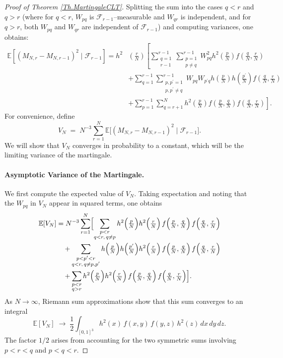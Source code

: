 \documentclass[11pt, reqno]{amsart}
\numberwithin{equation}{section}
\begin{document}
\begin{proof}[Proof of Theorem \ref{Th.MartingaleCLT}]
   
Splitting the sum into the cases $q<r$ and $q>r$ (where for $q<r$, $W_{pq}$ is $\mathcal F_{r-1}$–measurable and $W_{qr}$ is independent, and for $q>r$, both $W_{pq}$ and $W_{qr}$ are independent of $\mathcal F_{r-1}$) and computing variances, one obtains:
$$
\begin{aligned}
\mathbb{E}\left[\left(M_{N, r}-M_{N, r-1}\right)^2 \mid \mathcal{F}_{r-1}\right]=h^2 & \left(\frac{r}{N}\right)\left[\sum_{\substack{q=1 \\
r-1}}^{r-1} \sum_{\substack{p=1 \\
p \neq q}}^{r-1} W_{p q}^2 h^2\left(\frac{p}{N}\right) f\left(\frac{q}{N}, \frac{r}{N}\right)\right. \\
& +\sum_{q=1}^{r-1} \sum_{\substack{p, p^{\prime}=1 \\
p, p^{\prime} \neq q}}^{r-1} W_{p q} W_{p^{\prime} q} h\left(\frac{p}{N}\right) h\left(\frac{p^{\prime}}{N}\right) f\left(\frac{q}{N}, \frac{r}{N}\right) \\
& \left.+\sum_{p=1}^{r-1} \sum_{q=r+1}^N h^2\left(\frac{p}{N}\right) f\left(\frac{p}{N}, \frac{q}{N}\right) f\left(\frac{q}{N}, \frac{r}{N}\right)\right] .
\end{aligned}
$$
For convenience, define
\[
V_N \;=\; N^{-3}\sum_{r=1}^N \mathbb{E}\bigl[(M_{N,r} - M_{N,r-1})^2 \mid \mathcal{F}_{r-1}\bigr].
\]
We will show that $V_N$ converges in probability to a constant, which will be the limiting variance of the martingale.

\paragraph{\bf Asymptotic Variance of the Martingale.}
We first compute the expected value of $V_N$.  Taking expectation and noting that the $W_{pq}$ in $V_N$ appear in squared terms, one obtains
\[
\begin{aligned}
\mathbb{E}[V_N] &= N^{-3} \sum_{r=1}^N \Bigl[
   \sum_{\substack{p<r\\ q<r,\,q\neq p}} h^2\Bigl(\tfrac{p}{N}\Bigr)h^2\Bigl(\tfrac{r}{N}\Bigr)\,f\Bigl(\tfrac{p}{N},\tfrac{q}{N}\Bigr)\,f\Bigl(\tfrac{q}{N},\tfrac{r}{N}\Bigr) \\
&\quad + \sum_{\substack{p<p'<r\\ q<r,\,q\neq p,p'}} h\Bigl(\tfrac{p}{N}\Bigr)h\Bigl(\tfrac{p'}{N}\Bigr)h^2\Bigl(\tfrac{r}{N}\Bigr)\,f\Bigl(\tfrac{p}{N},\tfrac{q}{N}\Bigr)\,f\Bigl(\tfrac{q}{N},\tfrac{r}{N}\Bigr) \\
&\quad + \sum_{\substack{p<r\\ q>r}} h^2\Bigl(\tfrac{p}{N}\Bigr)h^2\Bigl(\tfrac{r}{N}\Bigr)\,f\Bigl(\tfrac{p}{N},\tfrac{q}{N}\Bigr)\,f\Bigl(\tfrac{q}{N},\tfrac{r}{N}\Bigr) \Bigr].
\end{aligned}
\]
As $N\to\infty$, Riemann sum approximations show that this sum converges to an integral
\[
\mathbb{E}[V_N] \;\longrightarrow\; \frac12 \int_{[0,1]^3} h^2(x)\,f(x,y)\,f(y,z)\,h^2(z)\,dx\,dy\,dz.
\]
The factor $1/2$ arises from accounting for the two symmetric sums involving $p<r<q$ and $p<q<r$.


\end{proof}
\end{document}
